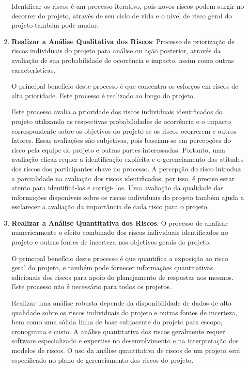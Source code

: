 \documentclass[
	12pt,
	openright,
	twoside,
	a4paper,
	english,
	brazil
	]{abntex2}
\begin{document}
\begin{enumerate}
  Identificar os riscos é um processo iterativo, pois novos riscos podem surgir no decorrer do projeto, através de seu ciclo de vida e o nível de risco geral do projeto também pode mudar.

  \item \textbf{Realizar a Análise Qualitativa dos Riscos}: Processo de priorização de riscos individuais do projeto para análise ou ação posterior, através da avaliação de sua probabilidade de ocorrência e impacto, assim como outras características.
  
  O principal benefício deste processo é que concentra os esforços em riscos de alta prioridade. Este processo é realizado ao longo do projeto.
  
  Este processo avalia a prioridade dos riscos individuais identificados do projeto utilizando as respectivas probabilidades de ocorrência e o impacto correspondente sobre os objetivos do projeto se os riscos ocorrerem e outros fatores. Essas avaliações são subjetivas, pois baseiam-se em percepções do risco pela equipe do projeto e outras partes interessadas. Portanto, uma avaliação eficaz requer a identificação explícita e o gerenciamento das atitudes dos riscos dos participantes chave no processo. A percepção do risco introduz a parcialidade na avaliação dos riscos identificados; por isso, é preciso estar atento para identificá-los e corrigi- los. Uma avaliação da qualidade das informações disponíveis sobre os riscos individuais do projeto também ajuda a esclarecer a avaliação da importância de cada risco para o projeto.

  \item \textbf{Realizar a Análise Quantitativa dos Riscos}: O processo de analisar numericamente o efeito combinado dos riscos individuais identificados no projeto e outras fontes de incerteza nos objetivos gerais do projeto.
  
  O principal benefício deste processo é que quantifica a exposição ao risco geral do projeto, e também pode fornecer informações quantitativas adicionais dos riscos para apoio do planejamento de respostas aos mesmos. Este processo não é necessário para todos os projetos.
  
  Realizar uma análise robusta depende da disponibilidade de dados de alta qualidade sobre os riscos individuais do projeto e outras fontes de incerteza, bem como uma sólida linha de base subjacente do projeto para escopo, cronograma e custo. A análise quantitativa dos riscos geralmente requer software especializado e expertise no desenvolvimento e na interpretação dos modelos de riscos. O uso da análise quantitativa de riscos de um projeto será especificado no plano de gerenciamento dos riscos do projeto.


\end{enumerate}
\end{document}

